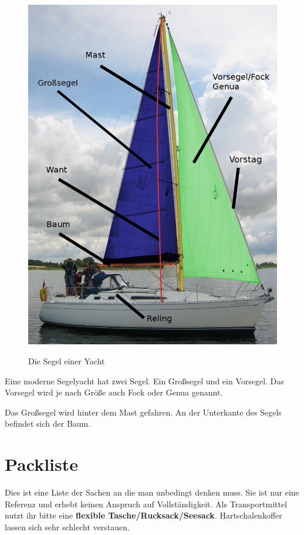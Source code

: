 \documentclass[12pt]{article}
\begin{document}
\begin{figure}[h!]
\begin{center}
\label{segel}
\includegraphics[scale=0.2]{bilder/yacht.png}
\end{center}
\caption{Die Segel einer Yacht}
\end{figure}

Eine moderne Segelyacht hat zwei Segel. Ein Großsegel und ein Vorsegel.
Das Vorsegel wird je nach Größe auch Fock oder Genua genannt.

Das Großsegel wird hinter dem Mast gefahren. An der Unterkante des Segels befindet sich der Baum.

\section{Packliste}
Dies ist eine Liste der Sachen an die man unbedingt denken muss. Sie ist nur eine Referenz und erhebt keinen Anspruch auf Vollständigkeit. Als Transportmittel nutzt ihr bitte eine \textbf{flexible Tasche/Rucksack/Seesack}. Hartschalenkoffer lassen sich sehr schlecht verstauen.
\end{document}
